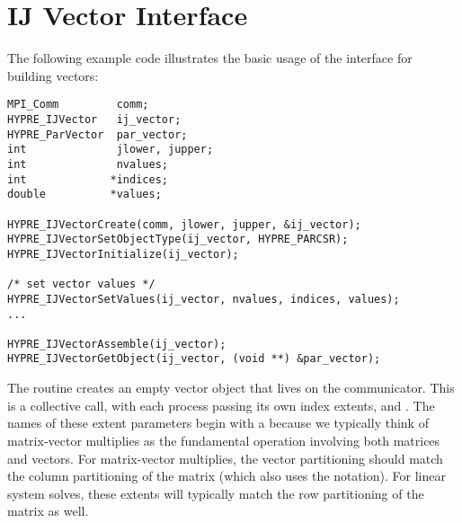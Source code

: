 %


\section{IJ Vector Interface}

The following example code illustrates the basic usage of the
 interface for building vectors:

\begin{display}
\begin{verbatim}
MPI_Comm         comm;
HYPRE_IJVector   ij_vector;
HYPRE_ParVector  par_vector;
int              jlower, jupper;
int              nvalues;
int             *indices;
double          *values;

HYPRE_IJVectorCreate(comm, jlower, jupper, &ij_vector);
HYPRE_IJVectorSetObjectType(ij_vector, HYPRE_PARCSR);
HYPRE_IJVectorInitialize(ij_vector);

/* set vector values */
HYPRE_IJVectorSetValues(ij_vector, nvalues, indices, values);
...

HYPRE_IJVectorAssemble(ij_vector);
HYPRE_IJVectorGetObject(ij_vector, (void **) &par_vector);

\end{verbatim}
\end{display}
The  routine creates an empty vector object that lives
on the  communicator.  This is a collective call, with each
process passing its own index extents,  and
.  The names of these extent parameters begin with a
 because we typically think of matrix-vector multiplies as
the fundamental operation involving both matrices and vectors.  For
matrix-vector multiplies, the vector partitioning should match the
column partitioning of the matrix (which also uses the 
notation).  For linear system solves, these extents will typically
match the row partitioning of the matrix as well.

